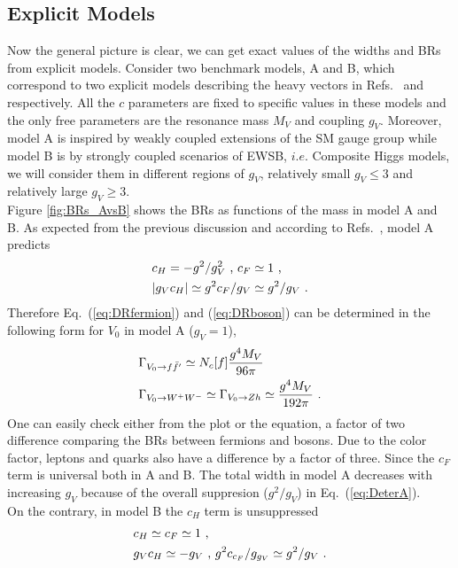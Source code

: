 \subsection{Explicit Models}
Now the general picture is clear, we can get exact values of the widths and BRs from explicit models. Consider two benchmark models, A and B, which correspond to two explicit models describing the heavy vectors in Refs.~\cite{modelA} and \cite{compositehiggs-1} respectively. All the $c$ parameters are fixed to specific values in these models and the only free parameters are the resonance mass $M_{V}$ and coupling $g_{V}$. Moreover, model A is inspired by weakly coupled extensions of the SM gauge group while model B is by strongly coupled scenarios of EWSB, $i.e.$ Composite Higgs models, we will consider them in different regions of $g_{V}$, relatively small $g_{V}\leq3$ and relatively large $g_{V}\geq3$.\\
\newline Figure \ref{fig:BRs_AvsB} shows the BRs as functions of the mass in model A and B. As expected from the previous discussion and according to Refs.~\cite{modelA}, model A predicts
\begin{align}
  \label{eq:DeterA}
  &c_{H}=-g^{2}/g_{V}^{2}\textup{ , }c_{F}\simeq 1 \textup{ ,} \nonumber\\
  &|g_{V}c_{H}|\simeq g^{2}c_{F}/g_{V}\simeq g^{2}/g_{V}\textup{ .}
\end{align}
Therefore Eq.~(\ref{eq:DRfermion}) and (\ref{eq:DRboson}) can be determined in the following form for $V_{0}$ in model A ($g_{V}=1$),
\begin{align}
  &\Gamma_{V_{0}\rightarrow f\bar{f}'}\simeq N_{c}[f]\frac{g^{4}M_{V}}{96\pi}\nonumber\\
  &\Gamma_{V_{0}\rightarrow W^{+}W^{-}}\simeq \Gamma_{V_{0}\rightarrow Zh}\simeq \frac{g^{4}M_{V}}{192\pi}\textup{ .}
\end{align}
One can easily check either from the plot or the equation, a factor of two difference comparing the BRs between fermions and bosons. Due to the color factor, leptons and quarks also have a difference by a factor of three. Since the $c_{F}$ term is universal both in A and B. The total width in model A decreases with increasing $g_{V}$ because of the overall suppresion ($g^{2}/g_{V}$) in Eq.~(\ref{eq:DeterA}).\\On the contrary, in model B the $c_{H}$ term is unsuppressed
\begin{align}
  \label{eq:DeterB}
  &c_{H}\simeq c_{F}\simeq 1 \textup{ ,}\nonumber\\
  &g_{V}c_{H}\simeq-g_{V}\textup{ , }g^{2}c_{c_{F}}/g_{g_{V}}\simeq g^{2}/g_{V}\textup{ .}
\end{align}
